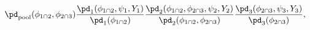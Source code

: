 \begin{equation}
  \pd_{\text{pool}}(\phi_{1 \cap 2}, \phi_{2 \cap 3})
  \frac {
    \pd_{1} (\phi_{1 \cap 2}, \psi_{1}, Y_{1})
  } {
    \pd_{1}(\phi_{1 \cap 2})
  }
  \frac {
    \pd_{2} (\phi_{1 \cap 2}, \phi_{2 \cap 3}, \psi_{2}, Y_{2})
  } {
    \pd_{2}(\phi_{1 \cap 2}, \phi_{2 \cap 3})
  }
  \frac {
    \pd_{3} (\phi_{2 \cap 3}, \psi_{3}, Y_{3})
  } {
    \pd_{3}(\phi_{2 \cap 3})
  },
  \label{eqn:melded-model-full}
\end{equation}